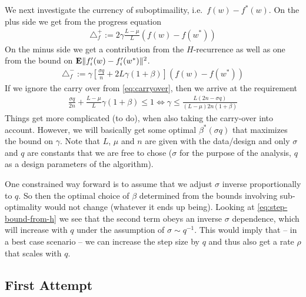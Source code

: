 \documentclass{article}
\newcommand{\E}{{\bf E}}
\begin{document}
We next investigate the currency of suboptimaility, i.e.~$f(w)-f^*(w)$.  On the plus side we get from the progress equation 
\begin{align}
\triangle_f^+ := 2 \gamma \frac{L-\mu}{L} (f(w) - f(w^*))
\end{align}
%
On the minus side we get a contribution from the $H$-recurrence as well as one from the bound on $\E \| f_i'(w) - f_i'(w^*) \|^2$. 
\begin{align}
\triangle_f^- := \gamma \left[ \frac {\sigma q} n  + 2L \gamma (1 + \beta) \right] (f(w) - f(w^*))
\end{align}
%
If we ignore the carry over from \eqref{eq:carryover}, then we arrive at the requirement 
\begin{align}
\frac {\sigma q} {2n}  + \frac{L-\mu}{L}  \gamma (1 + \beta) \le 1 \iff \gamma \le \frac{L (2n - \sigma q)} { (L-\mu) 2n (1+\beta)}
\end{align}
Things get more complicated (to do), when also taking the carry-over into account. However, we will basically get some optimal $\beta^*(\sigma q)$ that maximizes the bound on $\gamma$. Note that  $L$, $\mu$ and $n$ are given with the data/design and only $\sigma$ and $q$ are constants that we are free to chose ($\sigma$ for the purpose of the analysis, $q$ as a design parameters of the algorithm). 

One constrained way forward is to assume that we adjust $\sigma$ inverse proportionally to $q$. So then the optimal choice of $\beta$ determined from the bounds involving sub-optimality would not change (whatever it ends up being). Looking at \eqref{eq:step-bound-from-h} we see that the second term obeys an inverse $\sigma$ dependence, which will increase with $q$ under the assumption of $\sigma \sim q^{-1}$. This would imply that -- in a best case scenario -- we can increase the step size by $q$ and thus also get a rate $\rho$ that scales with $q$.  

\subsection{First Attempt}
\end{document}
